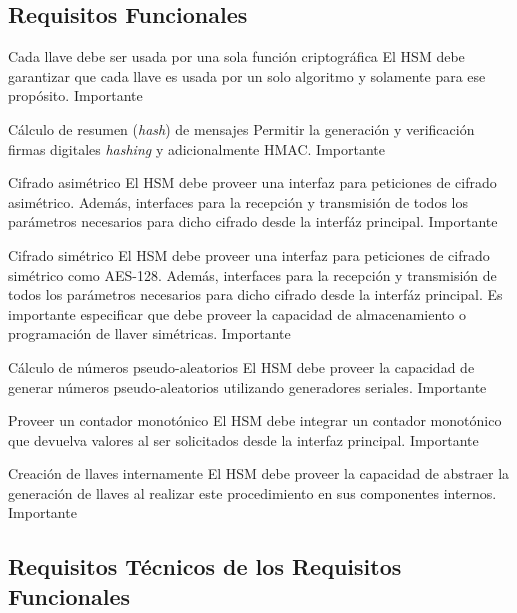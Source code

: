 \documentclass[a4paper]{article}
\begin{document}
    \subsection{Requisitos Funcionales}
    \begin{functional}
      {Cada llave debe ser usada por una sola función criptográfica}
      {El HSM debe garantizar que cada llave es usada por un solo algoritmo y solamente para ese propósito.}
      {Importante}
    
      {Cálculo de resumen (\textit{hash}) de mensajes}
      {Permitir la generación y verificación firmas digitales \textit{hashing} y adicionalmente HMAC.}
      {Importante}
            
      {Cifrado asimétrico}
      {El HSM debe proveer una interfaz para peticiones de cifrado asimétrico. Además, interfaces para la recepción y transmisión de todos los parámetros necesarios para dicho cifrado desde la interfáz principal.}
      {Importante}
            
      {Cifrado simétrico}
      {El HSM debe proveer una interfaz para peticiones de cifrado simétrico como AES-128. Además, interfaces para la recepción y transmisión de todos los parámetros necesarios para dicho cifrado desde la interfáz principal. Es importante especificar que debe proveer la capacidad de almacenamiento o programación de llaver simétricas.}
      {Importante}
            
      {Cálculo de números pseudo-aleatorios}
      {El HSM debe proveer la capacidad de generar números pseudo-aleatorios utilizando generadores seriales.}
      {Importante}
            
     {Proveer un contador monotónico}
     {El HSM debe integrar un contador monotónico que devuelva valores al ser solicitados desde la interfaz principal.}
     {Importante}
            
     {Creación de llaves internamente}
     {El HSM debe proveer la capacidad de abstraer la generación de llaves al realizar este procedimiento en sus componentes internos.}
     {Importante}
            
    \end{functional}

  \subsection{Requisitos Técnicos de los Requisitos Funcionales}
  
\end{document}
